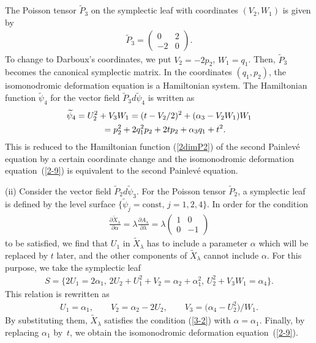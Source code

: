 \documentclass[pdftex]{sigma}
\numberwithin{equation}{section}
\begin{document}
The Poisson tensor $\widetilde{P}_3$ on the symplectic leaf with coordinates $(V_2,W_1)$ is given by
\begin{gather*}
\widetilde{P}_3 = \left(
\begin{matrix}
0 & 2 \\
-2 & 0
\end{matrix}
\right).
\end{gather*}
To change to Darboux's coordinates, we put $V_2 = -2p_2$, $W_1 = q_1$. Then, $\widetilde{P}_3$ becomes the canonical symplectic matrix. In the coordinates $(q_1, p_2)$, the isomonodromic deformation equation is a Hamiltonian system. The Hamiltonian function $\widetilde{\psi}_4$ for the vector f\/ield $\widetilde{P}_3d\widetilde{\psi}_4$ is written as
\begin{gather*}
\widetilde{\psi}_4 = U_2^2 + V_3W_1 = (t - V_2/2)^2 + (\alpha _3 - V_2W_1)W_1 \\
\hphantom{\widetilde{\psi}_4}{} = p_2^2 + 2q_1^2p_2 + 2tp_2 + \alpha _3 q_1 + t^2.
\end{gather*}
This is reduced to the Hamiltonian function (\ref{2dimP2}) of the second Painlev\'{e} equation by a certain coordinate change and the isomonodromic deformation equation~(\ref{2-9}) is equivalent to the second Painlev\'{e} equation.

(ii) Consider the vector f\/ield $\widetilde{P}_2 d\widetilde{\psi}_3$. For the Poisson tensor $\widetilde{P}_2$, a symplectic leaf is def\/ined by the level surface $\{ \widetilde{\psi}_j = \text{const},\, j=1,2,4\}$.
In order for the condition
\begin{gather}
\frac{\partial \widetilde{X}_\lambda }{\partial \alpha } = \lambda \frac{\partial A_\lambda }{\partial \lambda } = \lambda \left(
\begin{matrix}
1 & 0 \\
0 & -1
\end{matrix}
\right)\label{3-2}
\end{gather}
to be satisf\/ied, we f\/ind that $U_1$ in $\widetilde{X}_\lambda $ has to include a parameter $\alpha $ which will be replaced by $t$ later, and the other components of $\widetilde{X}_\lambda $ cannot include $\alpha $. For this purpose, we take the symplectic leaf
\begin{gather*}
S = \big\{ 2U_1 = 2 \alpha _1,\, 2U_2+U_1^2+V_2 = \alpha _2+\alpha _1^2 ,\, U_2^2+V_3W_1 = \alpha _4\big \}.
\end{gather*}
This relation is rewritten as
\begin{gather*}
U_1 = \alpha _1,\qquad V_2 = \alpha _2 - 2U_2, \qquad V_3 = \big(\alpha _4-U_2^2\big)/W_1.
\end{gather*}
By substituting them, $\widetilde{X}_\lambda $ satisf\/ies the condition (\ref{3-2}) with $\alpha =\alpha _1$. Finally, by replacing $\alpha _1$ by~$t$, we obtain the isomonodromic deformation equation~(\ref{2-9}).
\end{document}
